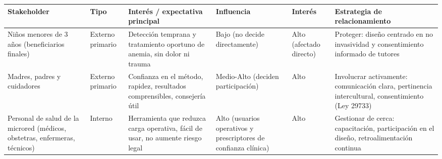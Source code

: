 \documentclass[11pt,a4paper]{article}
\begin{document}
{\small
\begin{longtable}[]{@{}
  >{\raggedright\arraybackslash}p{}
  >{\raggedright\arraybackslash}p{}
  >{\raggedright\arraybackslash}p{}
  >{\raggedright\arraybackslash}p{}
  >{\raggedright\arraybackslash}p{}
  >{\raggedright\arraybackslash}p{}@{}}
\toprule\noalign{}
\begin{minipage}[b]{\linewidth}\raggedright
Stakeholder
\end{minipage} & \begin{minipage}[b]{\linewidth}\raggedright
Tipo
\end{minipage} & \begin{minipage}[b]{\linewidth}\raggedright
Interés / expectativa principal
\end{minipage} & \begin{minipage}[b]{\linewidth}\raggedright
Influencia
\end{minipage} & \begin{minipage}[b]{\linewidth}\raggedright
Interés
\end{minipage} & \begin{minipage}[b]{\linewidth}\raggedright
Estrategia de relacionamiento
\end{minipage} \\
\midrule\noalign{}
\endhead
\bottomrule\noalign{}
\endlastfoot
Niños menores de 3 años (beneficiarios finales) & Externo primario & Detección temprana y tratamiento oportuno de anemia, sin dolor ni trauma & Bajo (no decide directamente) & Alto (afectado directo) & Proteger: diseño centrado en no invasividad y consentimiento informado de tutores \\
Madres, padres y cuidadores & Externo primario & Confianza en el método, rapidez, resultados comprensibles, consejería útil & Medio-Alto (deciden participación) & Alto & Involucrar activamente: comunicación clara, pertinencia intercultural, consentimiento (Ley 29733) \\
Personal de salud de la microred (médicos, obstetras, enfermeras, técnicos) & Interno & Herramienta que reduzca carga operativa, fácil de usar, no aumente riesgo legal & Alto (usuarios operativos y prescriptores de confianza clínica) & Alto & Gestionar de cerca: capacitación, participación en el diseño, retroalimentación continua \\

\end{longtable}}
\end{document}
